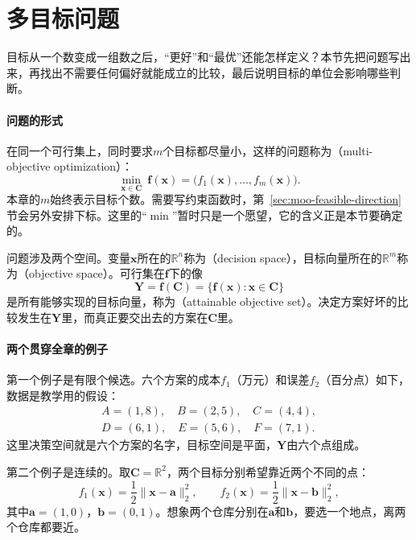 \section{多目标问题}
\label{sec:moo-problem}

目标从一个数变成一组数之后，“更好”和“最优”还能怎样定义？本节先把问题写出来，再找出不需要任何偏好就能成立的比较，最后说明目标的单位会影响哪些判断。

\paragraph{问题的形式}
在同一个可行集上，同时要求$m$个目标都尽量小，这样的问题称为（multi-objective optimization）：
\begin{equation}
 \min_{\bm{x}\in\bm{C}}\ \bm{f}(\bm{x})=\bigl(f_1(\bm{x}),\ldots,f_m(\bm{x})\bigr).
 \label{eq:moo-problem}
\end{equation}
本章的$m$始终表示目标个数。需要写约束函数时，第~\ref{sec:moo-feasible-direction}节会另外安排下标。这里的“$\min$”暂时只是一个愿望，它的含义正是本节要确定的。

问题涉及两个空间。变量$\bm{x}$所在的$\mathbb{R}^n$称为（decision space），目标向量所在的$\mathbb{R}^m$称为（objective space）。可行集在$\bm{f}$下的像
\begin{equation}
 \bm{Y}=\bm{f}(\bm{C})=\{\bm{f}(\bm{x}):\bm{x}\in\bm{C}\}
 \label{eq:moo-reachable}
\end{equation}
是所有能够实现的目标向量，称为（attainable objective set）。决定方案好坏的比较发生在$\bm{Y}$里，而真正要交出去的方案在$\bm{C}$里。

\paragraph{两个贯穿全章的例子}
第一个例子是有限个候选。六个方案的成本$f_1$（万元）和误差$f_2$（百分点）如下，数据是教学用的假设：
\begin{equation}
 \begin{gathered}
  A=(1,8),\quad B=(2,5),\quad C=(4,4),\\
  D=(6,1),\quad E=(5,6),\quad F=(7,1).
 \end{gathered}
 \label{eq:moo-candidates}
\end{equation}
这里决策空间就是六个方案的名字，目标空间是平面，$\bm{Y}$由六个点组成。

第二个例子是连续的。取$\bm{C}=\mathbb{R}^2$，两个目标分别希望靠近两个不同的点：
\begin{equation}
 f_1(\bm{x})=\frac12\lVert\bm{x}-\bm{a}\rVert_2^2,\qquad
 f_2(\bm{x})=\frac12\lVert\bm{x}-\bm{b}\rVert_2^2,
 \label{eq:moo-iso}
\end{equation}
其中$\bm{a}=(1,0)$，$\bm{b}=(0,1)$。想象两个仓库分别在$\bm{a}$和$\bm{b}$，要选一个地点，离两个仓库都要近。

